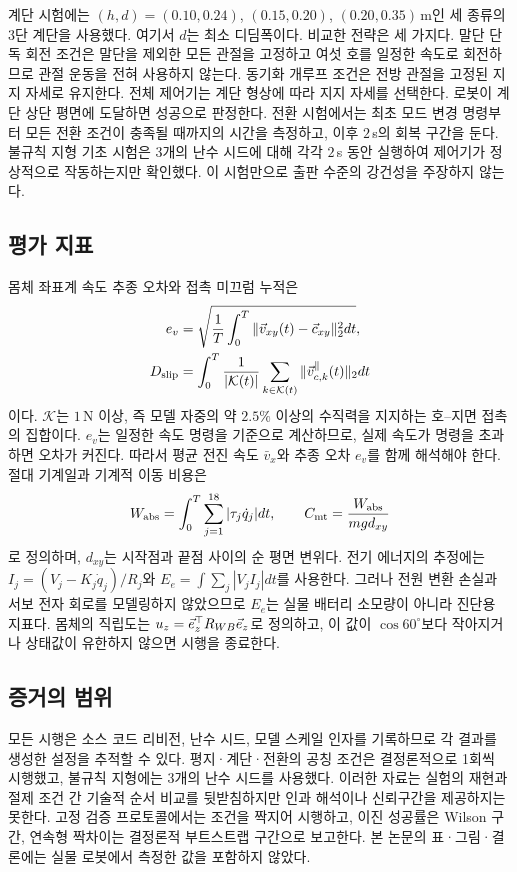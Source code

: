 계단 시험에는 $(h,d)=(0.10,0.24)$, $(0.15,0.20)$,
$(0.20,0.35)\,$m인 세 종류의 3단 계단을 사용했다. 여기서 $d$는 최소
디딤폭이다. 비교한 전략은 세 가지다. 말단 단독 회전 조건은 말단을 제외한 모든
관절을 고정하고 여섯 호를 일정한 속도로 회전하므로 관절 운동을 전혀 사용하지
않는다. 동기화 개루프 조건은 전방 관절을 고정된 지지 자세로 유지한다. 전체
제어기는 계단 형상에 따라 지지 자세를 선택한다. 로봇이 계단 상단 평면에
도달하면 성공으로 판정한다. 전환 시험에서는 최초 모드 변경 명령부터 모든 전환
조건이 충족될 때까지의 시간을 측정하고, 이후 $2\,$s의 회복 구간을 둔다. 불규칙
지형 기초 시험은 3개의 난수 시드에 대해 각각 $2\,$s 동안 실행하여 제어기가
정상적으로 작동하는지만 확인했다. 이 시험만으로 출판 수준의 강건성을 주장하지
않는다.

\subsection{평가 지표}

몸체 좌표계 속도 추종 오차와 접촉 미끄럼 누적은
\begin{align}
 e_v&=\sqrt{\frac1T\int_0^T\|\vec{v}_{xy}(t)-\vec{c}_{xy}\|_2^2dt}, \label{eq:rmse-ko}\\
 D_{\rm slip}&=\int_0^T\frac1{|\mathcal{K}(t)|}
 \sum_{k\in\mathcal{K}(t)}\|\vec{v}_{c,k}^{\parallel}(t)\|_2dt        \label{eq:slip-ko}
\end{align}
이다. $\mathcal{K}$는 $1\,$N 이상, 즉 모델 자중의 약 $2.5\%$ 이상의 수직력을
지지하는 호--지면 접촉의 집합이다. $e_v$는 일정한 속도 명령을 기준으로
계산하므로, 실제 속도가 명령을 초과하면 오차가 커진다. 따라서 평균 전진 속도
$\bar v_x$와 추종 오차 $e_v$를 함께 해석해야 한다. 절대 기계일과 기계적 이동
비용은
\begin{equation}
 W_{\rm abs}=\int_0^T\sum_{j=1}^{18}|\tau_j\dot q_j|dt,
 \qquad C_{\rm mt}=\frac{W_{\rm abs}}{mgd_{xy}}                \label{eq:cot-ko}
\end{equation}
로 정의하며, $d_{xy}$는 시작점과 끝점 사이의 순 평면 변위다. 전기 에너지의
추정에는 $I_j=(V_j-K_j\dot q_j)/R_j$와
$E_e=\int\sum_j|V_jI_j|dt$를 사용한다. 그러나 전원 변환 손실과 서보 전자 회로를
모델링하지 않았으므로 $E_e$는 실물 배터리 소모량이 아니라 진단용 지표다. 몸체의
직립도는 $u_z=\vec{e}_z^\top R_{WB}\vec{e}_z$로 정의하고, 이 값이
$\cos60^\circ$보다 작아지거나 상태값이 유한하지 않으면 시행을 종료한다.

\subsection{증거의 범위}

모든 시행은 소스 코드 리비전, 난수 시드, 모델 스케일 인자를 기록하므로 각 결과를
생성한 설정을 추적할 수 있다. 평지·계단·전환의 공칭 조건은 결정론적으로 1회씩
시행했고, 불규칙 지형에는 3개의 난수 시드를 사용했다. 이러한 자료는 실험의
재현과 절제 조건 간 기술적 순서 비교를 뒷받침하지만 인과 해석이나 신뢰구간을
제공하지는 못한다. 고정 검증 프로토콜에서는 조건을 짝지어 시행하고, 이진 성공률은
Wilson 구간, 연속형 짝차이는 결정론적 부트스트랩 구간으로 보고한다. 본 논문의
표·그림·결론에는 실물 로봇에서 측정한 값을 포함하지 않았다.
